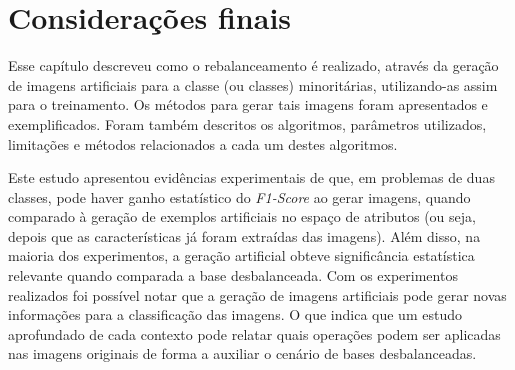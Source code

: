 \section{Considerações finais}

Esse capítulo descreveu como o rebalanceamento é realizado, através da geração de imagens artificiais para a classe (ou classes) minoritárias, utilizando-as assim para o treinamento. Os métodos para gerar tais imagens foram apresentados e exemplificados. Foram também descritos os algoritmos, parâmetros utilizados, limitações e métodos relacionados a cada um destes algoritmos.

Este estudo apresentou evidências experimentais de que, em problemas de duas classes, pode haver ganho estatístico do \textit{F1-Score} ao gerar imagens, quando comparado à geração de exemplos artificiais no espaço de atributos (ou seja, depois que as características já foram extraídas das imagens). Além disso, na maioria dos experimentos, a geração artificial obteve significância estatística relevante quando comparada a base desbalanceada. Com os experimentos realizados foi possível notar que a geração de imagens artificiais pode gerar novas informações para a classificação das imagens. O que indica que um estudo aprofundado de cada contexto pode relatar quais operações podem ser aplicadas nas imagens originais de forma a auxiliar o cenário de bases desbalanceadas.
